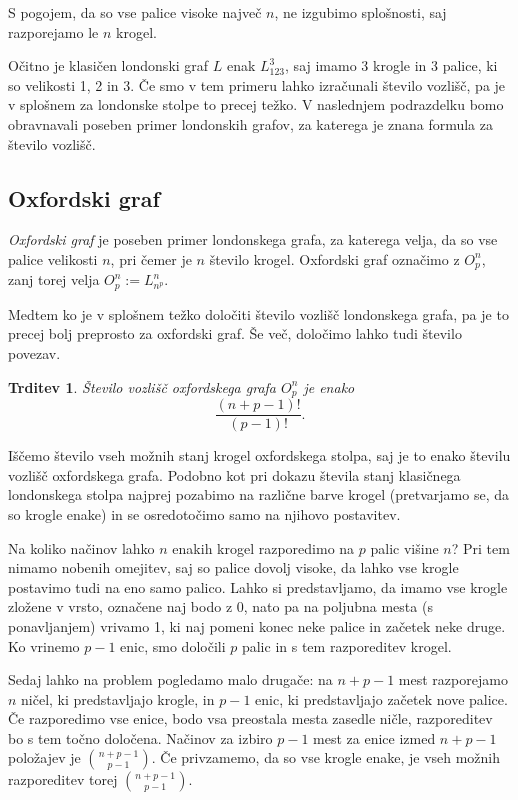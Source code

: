 \documentclass[12pt,a4paper]{amsart}
\theoremstyle{definition} %
\theoremstyle{plain} %
\newtheorem{trditev}[definicija]{Trditev}
\begin{document}
S pogojem, da so vse palice visoke največ $n$, ne izgubimo splošnosti, saj razporejamo le $n$ krogel.

Očitno je klasičen londonski graf $L$ enak $L_{123}^3$, saj imamo 3 krogle in 3 palice, ki so velikosti 1, 2 in 3.
Če smo v tem primeru lahko izračunali število vozlišč, pa je v splošnem za londonske stolpe to precej težko. V naslednjem podrazdelku bomo obravnavali poseben primer londonskih grafov, za katerega je znana formula za število vozlišč. 

\subsection{Oxfordski graf}

\emph{Oxfordski graf} je poseben primer londonskega grafa, za katerega velja, da so vse palice velikosti $n$, pri čemer je $n$ število krogel. Oxfordski graf označimo z $O^n_p$, zanj torej velja $O^n_p := L^n_{n^p}$.

Medtem ko je v splošnem težko določiti število vozlišč londonskega grafa, pa je to precej bolj preprosto za oxfordski graf. Še več, določimo lahko tudi število povezav.

\begin{trditev}
    Število vozlišč oxfordskega grafa $O^n_p$ je enako 
    \begin{equation}
        \label{eq:oxford-vozl}
        \frac{(n+p-1)!}{(p-1)!}.
    \end{equation}

\end{trditev}

\proof
    Iščemo število vseh možnih stanj krogel oxfordskega stolpa, saj je to enako številu vozlišč oxfordskega grafa.
    Podobno kot pri dokazu števila stanj klasičnega londonskega stolpa najprej pozabimo na različne barve krogel (pretvarjamo se, da so krogle enake) in se osredotočimo samo na njihovo postavitev. 
    
    Na koliko načinov lahko $n$ enakih krogel razporedimo na $p$ palic višine $n$? Pri tem nimamo nobenih omejitev, saj so palice dovolj visoke, da lahko vse krogle postavimo tudi na eno samo palico. Lahko si predstavljamo, da imamo vse krogle zložene v vrsto, označene naj bodo z 0, nato pa na poljubna mesta (s ponavljanjem) vrivamo 1, ki naj pomeni konec neke palice in začetek neke druge. Ko vrinemo $p-1$ enic, smo določili $p$ palic in s tem razporeditev krogel. 
    
    Sedaj lahko na problem pogledamo malo drugače: na $n+p-1$ mest razporejamo $n$ ničel, ki predstavljajo krogle, in $p-1$ enic, ki predstavljajo začetek nove palice. Če razporedimo vse enice, bodo vsa preostala mesta zasedle ničle, razporeditev bo s tem točno določena. Načinov za izbiro $p-1$ mest za enice izmed $n+p-1$ položajev je ${n+p-1 \choose p-1}$. Če privzamemo, da so vse krogle enake, je vseh možnih razporeditev torej ${n+p-1 \choose p-1}$.
    
\end{document}
